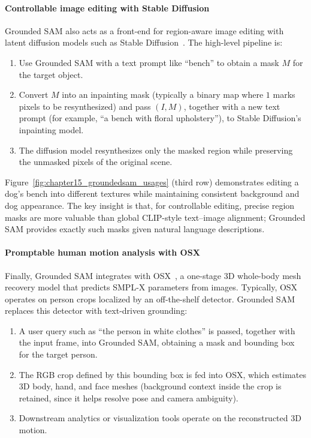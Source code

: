 \begin{enrichment}
\begin{enrichment}
		\paragraph{Controllable image editing with Stable Diffusion}
		Grounded SAM also acts as a front-end for region-aware image editing with latent diffusion models such as Stable Diffusion~\cite{rombach2022_ldm}.
		The high-level pipeline is:
		
		\begin{enumerate}
			\item Use Grounded SAM with a text prompt like ``bench'' to obtain a mask $M$ for the target object.
			\item Convert $M$ into an inpainting mask (typically a binary map where $1$ marks pixels to be resynthesized) and pass $(I, M)$, together with a new text prompt (for example, ``a bench with floral upholstery''), to Stable Diffusion’s inpainting model.
			\item The diffusion model resynthesizes only the masked region while preserving the unmasked pixels of the original scene.
		\end{enumerate}
		
		Figure~\ref{fig:chapter15_groundedsam_usages} (third row) demonstrates editing a dog’s bench into different textures while maintaining consistent background and dog appearance.
		The key insight is that, for controllable editing, precise region masks are more valuable than global CLIP-style text–image alignment; Grounded SAM provides exactly such masks given natural language descriptions.
		
		\paragraph{Promptable human motion analysis with OSX}
		Finally, Grounded SAM integrates with OSX~\cite{lin2023_osx}, a one-stage 3D whole-body mesh recovery model that predicts SMPL-X parameters from images.
		Typically, OSX operates on person crops localized by an off-the-shelf detector.
		Grounded SAM replaces this detector with text-driven grounding:
		
		\begin{enumerate}
			\item A user query such as ``the person in white clothes'' is passed, together with the input frame, into Grounded SAM, obtaining a mask and bounding box for the target person.
			\item The RGB crop defined by this bounding box is fed into OSX, which estimates 3D body, hand, and face meshes (background context inside the crop is retained, since it helps resolve pose and camera ambiguity).
			\item Downstream analytics or visualization tools operate on the reconstructed 3D motion.
		\end{enumerate}
		

\end{enrichment}
\end{enrichment}
